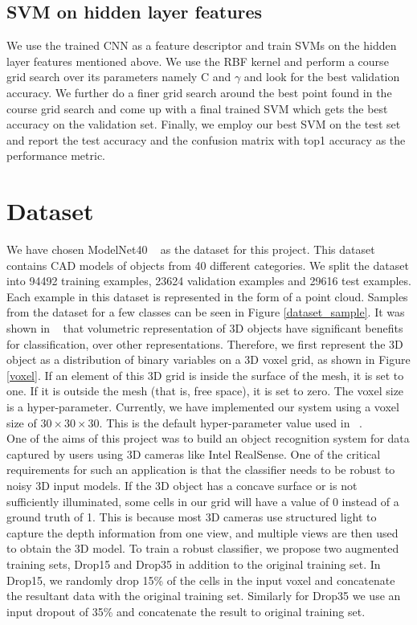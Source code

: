 \documentclass[10pt,twocolumn,letterpaper]{article}
\begin{document}
\subsection{SVM on hidden layer features}
We use the trained CNN as a feature descriptor and train SVMs on the hidden layer features mentioned above. We use the RBF kernel and perform a course grid search over its parameters namely C and $\gamma$ and look for the best validation accuracy. We further do a finer grid search around the best point found in the course grid search and come up with a final trained SVM which gets the best accuracy on the validation set. Finally, we employ our best SVM on the test set and report the test accuracy and the confusion matrix with top1 accuracy as the performance metric. 
\section{Dataset}
\label{sec:dataset_sec}
We have chosen ModelNet40 ~\cite{Authors14} as the dataset for this project. This dataset contains CAD models of objects from 40 different categories. We split the dataset into 94492 training examples, 23624 validation examples and 29616 test examples. 
Each example in this dataset is represented in the form of a point cloud. Samples from the dataset for a few classes can be seen in Figure \ref{dataset_sample}. It was shown in ~\cite{Authors14} that volumetric representation of 3D objects have significant benefits for classification, over other representations. Therefore, we first represent the 3D object as a distribution of binary variables on a 3D voxel grid, as shown in Figure \ref{voxel}. If an element of this 3D grid is inside the surface of the mesh, it is set to one. If it is outside the mesh (that is, free space), it is set to zero. The voxel size is a hyper-parameter. Currently, we have implemented our system using a voxel size of $30 \times 30 \times 30$. This is the default hyper-parameter value used in ~\cite{Authors14}.\\
One of the aims of this project was to build an object recognition system for data captured by users using 3D cameras like Intel RealSense. One of the critical requirements for such an application is that the classifier needs to be robust to noisy 3D input models. If the 3D object has a concave surface or is not sufficiently illuminated, some cells in our grid will have a value of 0 instead of a ground truth of 1. This is because most 3D cameras use structured light to capture the depth information from one view, and multiple views are then used to obtain the 3D model. To train a robust classifier, we propose two augmented training sets, Drop15 and Drop35 in addition to the original training set. In Drop15, we randomly drop 15\% of the cells in the input voxel and concatenate the resultant data with the original training set. Similarly for Drop35 we use an input dropout of 35\% and concatenate the result to original training set.
\end{document}
